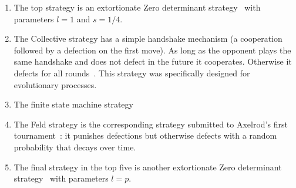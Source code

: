 \documentclass{article}
\begin{document}
\begin{enumerate}
    \item The top strategy is an extortionate Zero determinant
        strategy~\cite{Press2012} with parameters \(l=1\) and \(s=1/4\).
    \item The Collective strategy has a simple handshake mechanism (a
        cooperation followed by a defection on the first move). As long as the
        opponent plays the same handshake and does not defect in the future it
        cooperates. Otherwise it defects for all rounds~\cite{Li2009}.  This
        strategy was specifically designed for evolutionary processes.
    \item The finite state machine strategy %
    \item The Feld strategy is the corresponding strategy submitted to Axelrod's
        first tournament~\cite{Axelrod1980a}: it punishes defections but
        otherwise defects with a random probability that decays over time.
    \item The final strategy in the top five is another extortionate Zero
        determinant strategy~\cite{Press2012} with parameters \(l=p\).
\end{enumerate}
\end{document}
